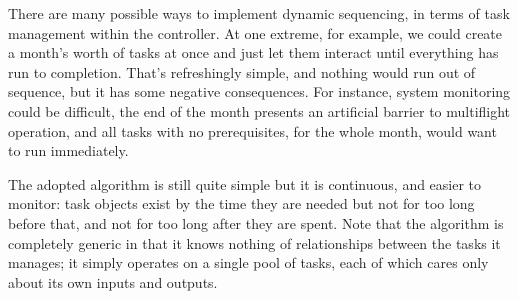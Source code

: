 \documentclass[12pt]{article}
\begin{document}
There are many possible ways to implement dynamic sequencing, in terms
of task management within the controller. At one extreme, for example,
we could create a month's worth of tasks at once and just let them
interact until everything has run to completion.  That's refreshingly
simple, and nothing would run out of sequence, but it has some negative
consequences. For instance, system monitoring could be difficult, the
end of the month presents an artificial barrier to multiflight
operation, and all tasks with no prerequisites, for the whole month,
would want to run immediately.

The adopted algorithm is still quite simple but it is continuous, and
easier to monitor: task objects exist by the time they are needed but
not for too long before that, and not for too long after they are spent.
Note that the algorithm is completely generic in that it knows nothing
of relationships between the tasks it manages; it simply operates on a
single pool of tasks, each of which cares only about its own inputs and
outputs.  
\end{document}
